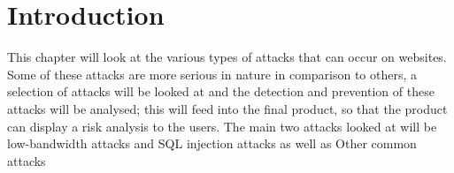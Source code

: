 
\section*{Introduction}
This chapter will look at the various types of attacks that can occur on websites. Some of these attacks are more serious in nature in comparison to others, a selection of attacks will be looked at and the detection and prevention of these attacks will be analysed; this will feed into the final product, so that the product can display a risk analysis to the users.  The main two attacks looked at will be  low-bandwidth attacks and SQL injection attacks as well as Other common attacks